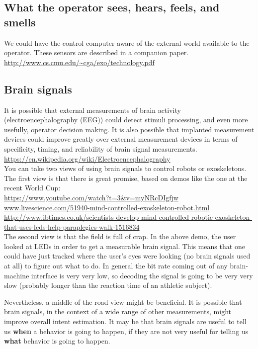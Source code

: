 \documentclass[letterpaper,12pt,fullpage]{article}
\begin{document}
\subsection{What the operator sees, hears, feels, and smells}

We could have the control computer aware of the external world
available to the operator. These sensors are described in
a companion paper.\\
\url{http://www.cs.cmu.edu/~cga/exo/technology.pdf}

\subsection{Brain signals}

It is possible that external measurements of brain activity
(electroencephalography (EEG)) could detect stimuli processing, and
even more usefully, operator decision making.
It is also possible that implanted measurement devices could improve
greatly over external measurement devices in terms of specificity,
timing, and reliability of brain signal measurements.\\
\url{https://en.wikipedia.org/wiki/Electroencephalography}\\

You can take two views of using brain signals to control robots or
exoskeletons.
The first view is that there is great promise, based on demos like
the one at the recent World Cup:\\
\url{https://www.youtube.com/watch?t=3&v=myNRcDIgfjw}\\
\url{www.livescience.com/51940-mind-controlled-exoskeleton-robot.html}\\
\url{http://www.ibtimes.co.uk/scientists-develop-mind-controlled-robotic-exoskeleton-that-uses-leds-help-paraplegics-walk-1516834}\\

The second view is that the field is full of crap. In the above demo,
the user looked at LEDs in order to get a measurable brain signal.
This means that one could have just tracked where the user's eyes were looking
(no brain signals used at all) to figure out what to do.
In general the bit rate coming out of any brain-machine interface is
very very low, so decoding the signal is going to be very very slow
(probably longer than the reaction time of an athletic subject).

Nevertheless, a middle of the road view might be beneficial. It is possible
that brain signals,
in the context of a wide range of other measurements,
might improve overall intent estimation.
It may be that brain signals are useful to tell us {\bf when} a behavior
is going to happen, if they are not very useful for telling us {\bf what}
behavior is going to happen.
\end{document}
